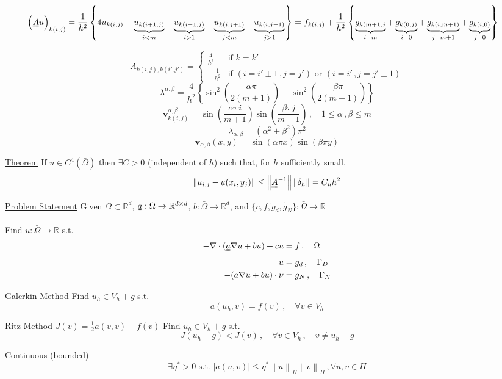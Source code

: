 \documentclass[letterpaper]{article}
\providecommand{\abs}[1]{\left\lvert#1\right\rvert}
\providecommand{\norm}[1]{\left\lVert#1\right\rVert}
\begin{document}
\footnotesize
\begin{align*}
\left(\uuline{A}u\right)_{k(i,j)}&=\frac{1}{h^2}\left\{4u_{k(i,j)}
-\underbrace{u_{k(i+1,j)}}_{i<m}
-\underbrace{u_{k(i-1,j)}}_{i>1}
-\underbrace{u_{k(i,j+1)}}_{j<m}
-\underbrace{u_{k(i,j-1)}}_{j>1}\right\}
=f_{k(i,j)}+\frac{1}{h^2}\left\{\underbrace{g_{k(m+1,j}}_{i=m}
+\underbrace{g_{k(0,j)}}_{i=0}
+\underbrace{g_{k(i,m+1)}}_{j=m+1}
+\underbrace{g_{k(i,0)}}_{j=0}\right\}
\end{align*}
\begin{multicols}{2}
\footnotesize
\[
A_{k(i,j),k(i',j')}=\begin{cases} 
\frac{4}{h^2} &\mbox{if } k = k' \\
-\frac{1}{h^2} & \mbox{if } (i=i'\pm1\,, j=j')\text{ or }
(i=i'\,,j=j'\pm1)
\end{cases}
\]
\[
\lambda^{\alpha,\beta}=\frac{4}{h^2}\left\{\sin^2\left(\frac{\alpha\pi}{2(m+1)}\right)
+\sin^2\left(\frac{\beta\pi}{2(m+1)}\right)\right\}
\]
\[
\mathbf{v}_{k(i,j)}^{\alpha,\beta}=\sin\left(\frac{\alpha\pi i}{m+1}\right)
\sin\left(\frac{\beta\pi j}{m+1}\right)\,,\quad 1\le\alpha\,,\beta\le m
\]
\[
\lambda_{\alpha,\beta}=(\alpha^2+\beta^2)\pi^2
\]
\[
\mathbf{v}_{\alpha,\beta}(x,y)=\sin(\alpha\pi x)\sin(\beta\pi y)
\]

\uline{Theorem} If $u\in C^4(\bar \Omega)$ then $\exists C>0$ (independent of
$h$) such that, for $h$ sufficiently small,
\[
\norm{u_{i,j}-u(x_i,y_j)}\le \norm{\uuline{A}^{-1}}\norm{\delta_h}=C_uh^2
\]

\uline{Problem Statement}
Given $\Omega\subset\mathbb{R}^d$,
$\uuline{a}:\bar\Omega\rightarrow\mathbb{R}^{d\times d}$,
$b:\bar\Omega\rightarrow\mathbb{R}^d$, and $\{c,f,\tilde g_d,\tilde
g_N\}:\bar\Omega\rightarrow\mathbb{R}$

Find $u:\bar\Omega\rightarrow\mathbb{R}$ s.t.
\begin{align*}
-\nabla\cdot(\uuline{a}\nabla u+bu)+cu&=f\,,\quad \Omega\\
u&=g_d\,,\quad\Gamma_D\\
-(a\nabla u+bu)\cdot\nu&=g_N\,,\quad\Gamma_N
\end{align*}

\uline{Galerkin Method} 
Find $u_h\in V_h+g$ s.t.
\[
a(u_h,v)=f(v)\,,\quad\forall v\in V_h
\]

\uline{Ritz Method} $J(v)=\frac{1}{2}a(v,v)-f(v)$ Find $u_h\in V_h+g$ s.t.
\[
J(u_h-g)<J(v)\,,\quad\forall v\in V_h\,,\quad v\neq u_h-g
\]

\uline{Continuous (bounded)}
\[
\exists\eta^*>0\text{ s.t. }\abs{a(u,v)}\le\eta^*\norm{u}_H\norm{v}_H\,,\forall
u,v\in H
\]


\end{multicols}
\end{document}
